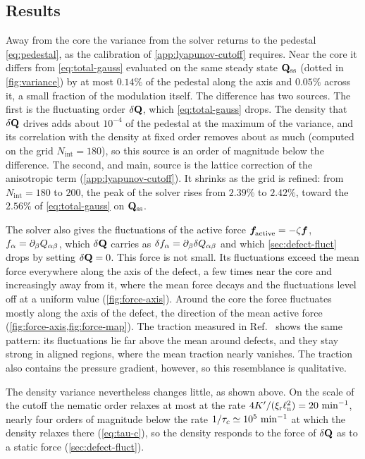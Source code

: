\documentclass[aps,pre,reprint,superscriptaddress,longbibliography,nofootinbib
]{revtex4-2}
\begin{document}
\subsection{Results}
\label{app:lyapunov-results}
Away from the core the variance from the solver returns to
the pedestal \cref{eq:pedestal}, as the calibration of
\cref{app:lyapunov-cutoff} requires. Near the core it
differs from \cref{eq:total-gauss} evaluated on the same
steady state $\Q_\ss$ (dotted in \cref{fig:variance}) by at
most $0.14\%$ of the pedestal along the axis and $0.05\%$
across it, a small fraction of the modulation itself. The
difference has two sources. The first is the fluctuating
order $\delta\Q$, which \cref{eq:total-gauss} drops. The
density that $\delta\Q$ drives adds about $10^{-4}$ of the
pedestal at the maximum of the variance, and its
correlation with the density at fixed order removes about
as much (computed on the grid $N_\mathrm{int}=180$), so
this source is an order of magnitude below the difference.
The second, and main, source is the lattice correction of
the anisotropic term (\cref{app:lyapunov-cutoff}). It
shrinks as the grid is refined: from $N_\mathrm{int}=180$
to $200$, the peak of the solver rises from $2.39\%$ to
$2.42\%$, toward the $2.56\%$ of \cref{eq:total-gauss} on
$\Q_\ss$.

The solver also gives the fluctuations of the active force
$\bfa=-\zeta\bs f$, $f_\alpha=\partial_\beta Q_\ab$, which
$\delta\Q$ carries as $\delta f_\alpha=\partial_\beta\delta
Q_\ab$ and which \cref{sec:defect-fluct} drops by setting
$\delta\Q=0$. This force is not small. Its
fluctuations exceed the mean force everywhere along the
axis of the defect, a few times near the core and
increasingly away from it, where the mean force decays and
the fluctuations level off at a uniform value
(\cref{fig:force-axis}). Around the core the force
fluctuates mostly along the axis of the defect, the
direction of the mean active force
(\cref{fig:force-axis,fig:force-map}). The traction
measured in Ref.~\cite{han2025local} shows the same
pattern: its fluctuations lie far above the mean around
defects, and they stay strong in aligned regions, where the
mean traction nearly vanishes. The traction also contains
the pressure gradient, however, so this resemblance is
qualitative.

The density variance nevertheless changes little, as shown
above. On the scale of the cutoff the nematic order relaxes
at most at the rate $4K'/(\xir\elln^2)=20~\minute^{-1}$,
nearly four orders of magnitude below the rate
$1/\tau_c\simeq10^5~\minute^{-1}$ at which the density
relaxes there (\cref{eq:tau-c}), so the density responds to
the force of $\delta\Q$ as to a static force
(\cref{sec:defect-fluct}).




\end{document}
